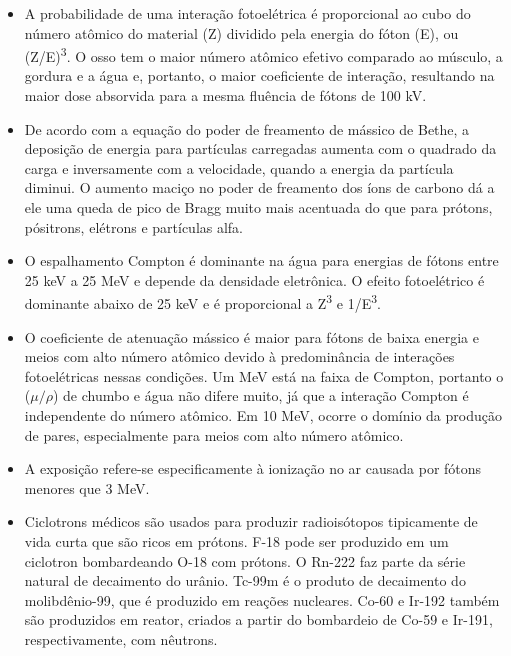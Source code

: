 \documentclass[11pt,a4paper]{article}
\newcounter{exemplo}
\begin{document}
\begin{exemplo}[Física]
\begin{itemize}
        \item A probabilidade de uma interação fotoelétrica é proporcional ao cubo do número atômico do material (Z) dividido pela energia do fóton (E), ou (Z/E)\textsuperscript{3}. O osso tem o maior número atômico efetivo comparado ao músculo, a gordura e a água e, portanto, o maior coeficiente de interação, resultando na maior dose absorvida para a mesma fluência de fótons de 100 kV.
        
        \item De acordo com a equação do poder de freamento de mássico de Bethe, a deposição de energia para partículas carregadas aumenta com o quadrado da carga e inversamente com a velocidade, quando a energia da partícula diminui. O aumento maciço no poder de freamento dos íons de carbono dá a ele uma queda de pico de Bragg muito mais acentuada do que para prótons, pósitrons, elétrons e partículas alfa.
        
        \item O espalhamento Compton é dominante na água para energias de fótons entre 25 keV a 25 MeV e depende da densidade eletrônica. O efeito fotoelétrico é dominante abaixo de 25 keV e é proporcional a Z\textsuperscript{3} e 1/E\textsuperscript{3}.
        
        \item O coeficiente de atenuação mássico é maior para fótons de baixa energia e meios com alto número atômico devido à predominância de interações fotoelétricas nessas condições. Um MeV está na faixa de Compton, portanto o ($\mu/\rho$) de chumbo e água não difere muito, já que a interação Compton é independente do número atômico. Em 10 MeV, ocorre o domínio da produção de pares, especialmente para meios com alto número atômico.
        
        \item A exposição refere-se especificamente à ionização no ar causada por fótons menores que 3 MeV.
        
        \item Ciclotrons médicos são usados para produzir radioisótopos tipicamente de vida curta que são ricos em prótons. F-18 pode ser produzido em um ciclotron bombardeando O-18 com prótons. O Rn-222 faz parte da série natural de decaimento do urânio. Tc-99m é o produto de decaimento do molibdênio-99, que é produzido em reações nucleares. Co-60 e Ir-192 também são produzidos em reator, criados a partir do bombardeio de Co-59 e Ir-191, respectivamente, com nêutrons.
        

\end{itemize}
\end{exemplo}
\end{document}

